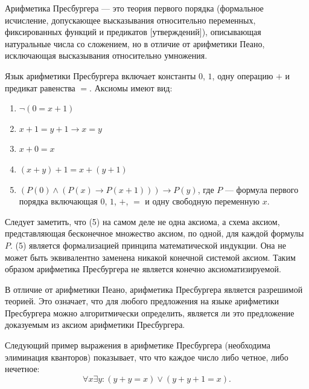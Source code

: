 


    \begin{Def}
        Арифметика Пресбургера — это теория первого порядка (формальное исчисление, допускающее высказывания относительно переменных, фиксированных функций и предикатов [утверждений]), описывающая натуральные числа со сложением, но в отличие от арифметики Пеано, исключающая высказывания относительно умножения.
    \end{Def}
    \begin{Def}
        Язык арифметики Пресбургера включает константы $0$, $1$, одну операцию $+$ и предикат равенства $=$. Аксиомы имеют вид:
        \begin{enumerate}
            \item $\neg (0 = x + 1)$
            \item $x + 1 = y + 1 \rightarrow x = y$
            \item $x + 0 = x$
            \item $(x + y) + 1 = x + (y + 1)$
            \item$ (P(0) \wedge (P(x) \rightarrow P(x + 1))) \rightarrow P(y)$, где $P$ ---  формула первого порядка включающая $0$, $1$, $+$, $=$ и одну свободную переменную $x$.
        \end{enumerate}
        Следует заметить, что (5) на самом деле не одна аксиома, а схема аксиом, представляющая бесконечное множество аксиом, по одной, для каждой формулы $P$. (5) является формализацией принципа математической индукции. Она не может быть эквивалентно заменена никакой конечной системой аксиом. Таким образом арифметика Пресбургера не является конечно аксиоматизируемой.
    \end{Def}
    \begin{Rem}
        В отличие от арифметики Пеано, арифметика Пресбургера является разрешимой теорией. Это означает, что для любого предложения на языке арифметики Пресбургера можно алгоритмически определить, является ли это предложение доказуемым из аксиом арифметики Пресбургера.
    \end{Rem}
    \begin{Example}
        Следующий пример выражения в арифметике Пресбургера (необходима элиминация кванторов) показывает, что что каждое число либо четное, либо нечетное:
        $$\forall x \exists y : (y + y = x) \vee (y + y + 1 = x).$$
    \end{Example}
